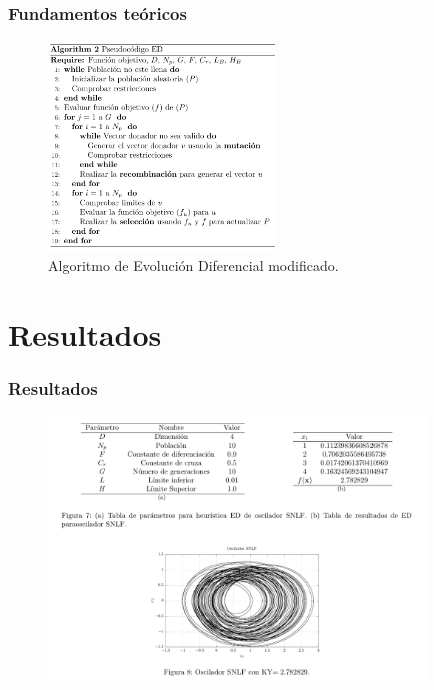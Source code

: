 \documentclass[10pt]{beamer}
\begin{document}
	\begin{frame}
		\frametitle{Fundamentos teóricos}

		
		\begin{figure}[hbtp]
			\centering
			\includegraphics[width = 6cm]{alg2.png}
			\caption{Algoritmo de Evolución Diferencial modificado.}
		\end{figure}
		
	\end{frame}

	\section{Resultados}
	
	
	\begin{frame}
		\frametitle{Resultados}

		
		\begin{figure}[hbtp]
			\centering
			\includegraphics[width = 10cm]{ex1.png}
		\end{figure}
		
	\end{frame}
	
\end{document}
